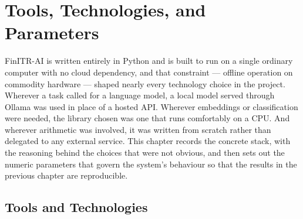 
\chapter{Tools, Technologies, and Parameters}
\label{chap:tools}

FinITR-AI is written entirely in Python and is built to run on a single ordinary
computer with no cloud dependency, and that constraint --- offline operation on
commodity hardware --- shaped nearly every technology choice in the project.
Wherever a task called for a language model, a local model served through Ollama
was used in place of a hosted API. Wherever embeddings or classification were
needed, the library chosen was one that runs comfortably on a CPU. And wherever
arithmetic was involved, it was written from scratch rather than delegated to any
external service. This chapter records the concrete stack, with the reasoning
behind the choices that were not obvious, and then sets out the numeric
parameters that govern the system's behaviour so that the results in the
previous chapter are reproducible.

\section{Tools and Technologies}
\label{sec:tools}

